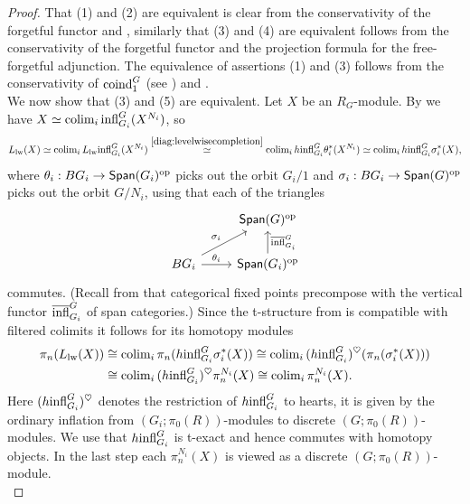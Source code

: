 \documentclass[reqno]{amsart}
\numberwithin{equation}{section}\theoremstyle{thms}
\theoremstyle{defn}
\newcommand{\tn}[1]{\textnormal{#1}}
\newcommand{\tsf}[1]{\textsf{\textup{#1}}}
\newcommand{\overl}[1]{\overline{#1}}
\newcommand{\op}{\tn{op}}
\newcommand{\Spans}{\tsf{Span}}
\begin{document}
\begin{proof}
That (1) and (2) are equivalent is clear from the conservativity of the forgetful functor and , similarly that (3) and (4) are equivalent follows from the conservativity of the forgetful functor and the projection formula for the free-forgetful adjunction. The equivalence of assertions (1) and (3) follows from the conservativity of $\tn{coind}^G_1$ (see ) and . \\
We now show that (3) and (5) are equivalent. Let $X$ be an $R_G$-module. By \cite[Lemma 6.3.3.6]{lur09} we have $X \simeq \tn{colim}_i \, \tn{infl}^G_{G_i}(X^{N_i})$, so 
$$L_{\tn{lw}}(X) \simeq \tn{colim}_i \, L_{\tn{lw}}\tn{infl}^G_{G_i}(X^{N_i}) \stackrel{\ref{diag:levelwisecompletion}}{\simeq} \tn{colim}_i \, h\tn{infl}^G_{G_i}\theta_i^*(X^{N_i}) \simeq \tn{colim}_i \, h\tn{infl}^G_{G_i}\sigma_i^*(X),$$
where $\theta_i: BG_i \to \Spans(G_i)^{\op}$ picks out the orbit $G_i/1$ and $\sigma_i: BG_i \to \Spans(G)^{\op}$ picks out the orbit $G/N_i$, using that each of the triangles
\[\begin{tikzcd}
	& {\Spans(G)^{\op}} \\
	{BG_i} & {\Spans(G_i)^{\op}}
	\arrow["{\sigma_i}", from=2-1, to=1-2]
	\arrow["{\theta_i}", from=2-1, to=2-2]
	\arrow["{\overl{\tn{infl}}^G_{G_i}}"', from=2-2, to=1-2]
\end{tikzcd}\]
commutes. (Recall from  that categorical fixed points precompose with the vertical functor $\overl{\tn{infl}}^G_{G_i}$ of span categories.) Since the t-structure from  is compatible with filtered colimits it follows for its homotopy modules
\begin{align*}
\pi_n(L_{\tn{lw}}(X)) &\cong \tn{colim}_i \, \pi_n(h\tn{infl}^G_{G_i}\sigma_i^*(X)) \cong \tn{colim}_i \, (h\tn{infl}^G_{G_i})^{\heartsuit} (\pi_n(\sigma_i^*(X))) \\
&\cong \tn{colim}_i \, (h\tn{infl}^G_{G_i})^{\heartsuit} \pi_n^{N_i}(X) \cong \tn{colim}_i \, \pi_n^{N_i}(X).
\end{align*}
Here $(h\tn{infl}^G_{G_i})^{\heartsuit}$ denotes the restriction of $h\tn{infl}^G_{G_i}$ to hearts, it is given by the ordinary inflation from $(G_i;\pi_0(R))$-modules to discrete $(G;\pi_0(R))$-modules. We use that $h\tn{infl}^G_{G_i}$ is t-exact and hence commutes with homotopy objects. In the last step each $\pi_n^{N_i}(X)$ is viewed as a discrete $(G;\pi_0(R))$-module.\\

\end{proof}
\end{document}

